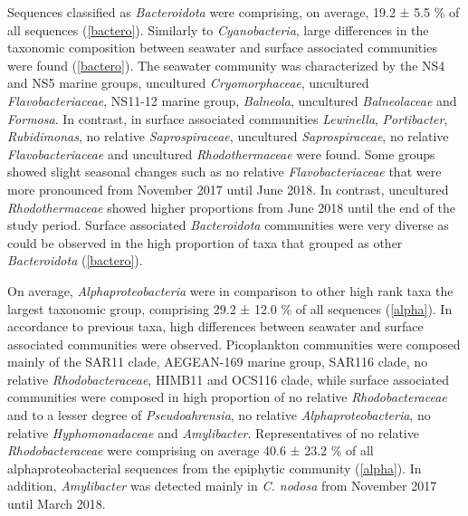 \documentclass[12pt,]{article}
\begin{document}
Sequences classified as \emph{Bacteroidota} were comprising, on average,
19.2 ± 5.5 \si{\percent} of all sequences (\autoref{bactero}). Similarly
to \emph{Cyanobacteria}, large differences in the taxonomic composition
between seawater and surface associated communities were found
(\autoref{bactero}). The seawater community was characterized by the NS4
and NS5 marine groups, uncultured \emph{Cryomorphaceae}, uncultured
\emph{Flavobacteriaceae}, NS11-12 marine group, \emph{Balneola},
uncultured \emph{Balneolaceae} and \emph{Formosa}. In contrast, in
surface associated communities \emph{Lewinella}, \emph{Portibacter},
\emph{Rubidimonas}, no relative \emph{Saprospiraceae}, uncultured
\emph{Saprospiraceae}, no relative \emph{Flavobacteriaceae} and
uncultured \emph{Rhodothermaceae} were found. Some groups showed slight
seasonal changes such as no relative \emph{Flavobacteriaceae} that were
more pronounced from November 2017 until June 2018. In contrast,
uncultured \emph{Rhodothermaceae} showed higher proportions from June
2018 until the end of the study period. Surface associated
\emph{Bacteroidota} communities were very diverse as could be observed
in the high proportion of taxa that grouped as other \emph{Bacteroidota}
(\autoref{bactero}).

On average, \emph{Alphaproteobacteria} were in comparison to other high
rank taxa the largest taxonomic group, comprising 29.2 ± 12.0
\si{\percent} of all sequences (\autoref{alpha}). In accordance to
previous taxa, high differences between seawater and surface associated
communities were observed. Picoplankton communities were composed mainly
of the SAR11 clade, AEGEAN-169 marine group, SAR116 clade, no relative
\emph{Rhodobacteraceae}, HIMB11 and OCS116 clade, while surface
associated communities were composed in high proportion of no relative
\emph{Rhodobacteraceae} and to a lesser degree of \emph{Pseudoahrensia},
no relative \emph{Alphaproteobacteria}, no relative
\emph{Hyphomonadaceae} and \emph{Amylibacter}. Representatives of no
relative \emph{Rhodobacteraceae} were comprising on average 40.6 ± 23.2
\si{\percent} of all alphaproteobacterial sequences from the epiphytic
community (\autoref{alpha}). In addition, \emph{Amylibacter} was
detected mainly in \emph{C. nodosa} from November 2017 until March 2018.
\end{document}
